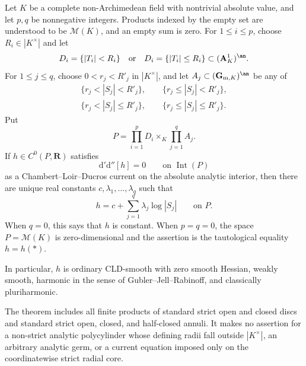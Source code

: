 \begin{theorem}\label{thm:p062-endpoint-polycylinder-v4-research}
Let \(K\) be a complete non-Archimedean field with nontrivial absolute
value, and let \(p,q\) be nonnegative integers.  Products indexed by the
empty set are understood to be \(\mathcal M(K)\), and an empty sum is zero.
For \(1\leq i\leq p\), choose \(R_i\in|K^\times|\) and let
\[
 D_i=\{|T_i|<R_i\}
       \quad\text{or}\quad
 D_i=\{|T_i|\leq R_i\}
       \subset (\mathbf A^1_K)^{\an}.
\]
For \(1\leq j\leq q\), choose
\(
 0<r_j<R'_j
\)
in \(|K^\times|\), and let \(A_j\subset(\mathbf G_{\mathrm m,K})^{\an}\)
be any of
\[
\begin{gathered}
 \{r_j<|S_j|<R'_j\},\qquad
 \{r_j\leq|S_j|<R'_j\},\\
 \{r_j<|S_j|\leq R'_j\},\qquad
 \{r_j\leq|S_j|\leq R'_j\}.
\end{gathered}
\]
Put
\begin{equation}\label{eq:p062-endpoint-polycylinder-domain-v4-research}
             P=\prod_{i=1}^pD_i\times_K\prod_{j=1}^qA_j.
\end{equation}
If \(h\in C^0(P,\mathbf R)\) satisfies
\begin{equation}\label{eq:p062-endpoint-polycylinder-current-v4-research}
              \mathrm d'\mathrm d''[h]=0
              \qquad\text{on }\operatorname{Int}(P)
\end{equation}
as a Chambert--Loir--Ducros current on the absolute analytic interior,
then there are unique real constants
\(c,\lambda_1,\ldots,\lambda_q\) such that
\begin{equation}\label{eq:p062-endpoint-polycylinder-affine-v4-research}
                  h=c+\sum_{j=1}^q\lambda_j\log|S_j|
                  \qquad\text{on }P.
\end{equation}
When \(q=0\), this says that \(h\) is constant.  When \(p=q=0\), the
space \(P=\mathcal M(K)\) is zero-dimensional and the assertion is the
tautological equality \(h=h(*)\).

In particular, \(h\) is ordinary CLD-smooth with zero smooth Hessian,
weakly smooth, harmonic in the sense of Gubler--Jell--Rabinoff, and
classically pluriharmonic.

The theorem includes all finite products of standard strict open and closed
discs and standard strict open, closed, and half-closed annuli.  It makes no
assertion for a non-strict analytic polycylinder whose defining radii fall
outside \(|K^\times|\), an arbitrary analytic germ, or a current equation
imposed only on the coordinatewise strict radial core.
\end{theorem}
